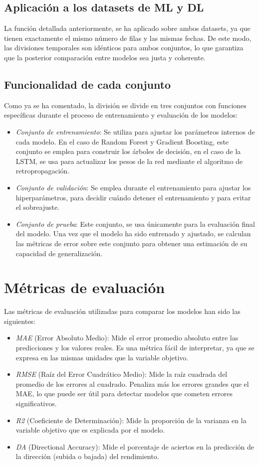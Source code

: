 \subsection{Aplicación a los datasets de ML y DL}
La función detallada anteriormente, se ha aplicado sobre ambos datasets, ya que tienen exactamente el mismo número de filas y las mismas fechas. De este modo, las divisiones temporales son idénticos para ambos conjuntos, lo que garantiza que la posterior comparación entre modelos sea justa y coherente.

\subsection{Funcionalidad de cada conjunto}
Como ya se ha comentado, la división se divide en tres conjuntos con funciones específicas durante el proceso de entrenamiento y evaluación de los modelos:

\begin{itemize}
    \item \emph{Conjunto de entrenamiento}: Se utiliza para ajustar los parámetros internos de cada modelo. En el caso de Random Forest y Gradient Boosting, este conjunto se emplea para construir los árboles de decisión, en el caso de la LSTM, se usa para actualizar los pesos de la red mediante el algoritmo de retropropagación.
    \item \emph{Conjunto de validación}: Se emplea durante el entrenamiento para ajustar los hiperparámetros, para decidir cuándo detener el entrenamiento y para evitar el sobreajuste. 
    \item \emph{Conjunto de prueba}: Este conjunto, se usa únicamente para la evaluación final del modelo. Una vez que el modelo ha sido entrenado y ajustado, se calculan las métricas de error sobre este conjunto para obtener una estimación de su capacidad de generalización. 
\end{itemize}

\section{Métricas de evaluación}
Las métricas de evaluación utilizadas para comparar los modelos han sido las siguientes:
\begin{itemize}
    \item \emph{MAE} (Error Absoluto Medio): Mide el error promedio absoluto entre las predicciones y los valores reales. Es una métrica fácil de interpretar, ya que se expresa en las mismas unidades que la variable objetivo.
    \item \emph{RMSE} (Raíz del Error Cuadrático Medio): Mide la raíz cuadrada del promedio de los errores al cuadrado. Penaliza más los errores grandes que el MAE, lo que puede ser útil para detectar modelos que cometen errores significativos.
    \item \emph{R2} (Coeficiente de Determinación): Mide la proporción de la varianza en la variable objetivo que es explicada por el modelo.
    \item \emph{DA} (Directional Accuracy): Mide el porcentaje de aciertos en la predicción de la dirección (subida o bajada) del rendimiento.
\end{itemize}

